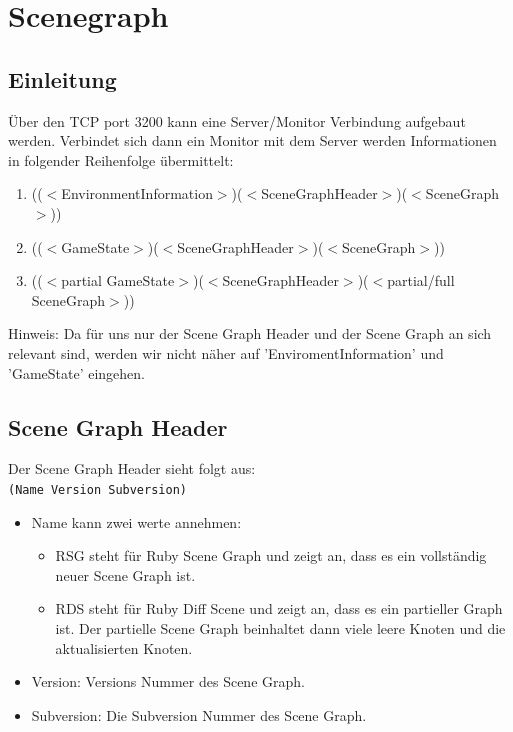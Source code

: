\section{Scenegraph}
\subsection{Einleitung}
Über den TCP port 3200 kann eine Server/Monitor Verbindung aufgebaut 
werden. Verbindet sich dann ein Monitor mit dem Server werden 
Informationen in folgender Reihenfolge übermittelt:

\begin{enumerate}
\item  (($<$EnvironmentInformation$>$)($<$SceneGraphHeader$>$)($<$SceneGraph$>$))
\item  (($<$GameState$>$)($<$SceneGraphHeader$>$)($<$SceneGraph$>$))
\item  (($<$partial GameState$>$)($<$SceneGraphHeader$>$)($<$partial/full SceneGraph$>$))
\end{enumerate}
Hinweis: Da für uns nur der Scene Graph Header und der Scene Graph an
 sich relevant sind, werden wir nicht näher auf 'EnviromentInformation' 
und 'GameState' eingehen.

\subsection{Scene Graph Header}
Der Scene Graph Header sieht folgt aus:\\
\texttt{(Name Version Subversion)}

\begin{itemize}
\item  Name kann zwei werte annehmen:
\begin{itemize}
	\item  RSG steht für Ruby Scene Graph und zeigt an, dass es ein vollständig neuer Scene Graph ist.
	\item  RDS steht für Ruby Diff Scene und zeigt an, dass es ein 
	partieller Graph ist. Der partielle Scene Graph beinhaltet dann viele 
	leere Knoten und die aktualisierten Knoten.
\end{itemize}
\item  Version: Versions Nummer des Scene Graph.
\item  Subversion: Die Subversion Nummer des Scene Graph.
\end{itemize}
